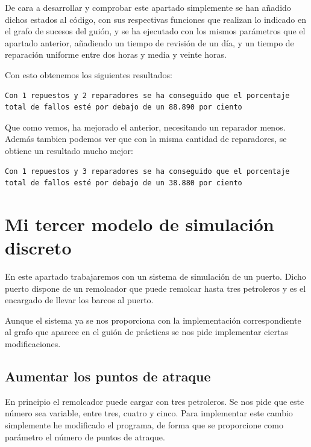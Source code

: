 \documentclass[12pt, spanish]{article}
\begin{document}
De cara a desarrollar y comprobar este apartado simplemente se han añadido dichos estados al código, con sus respectivas funciones que realizan lo indicado en el grafo de sucesos del guión, y se ha ejecutado con los mismos parámetros que el apartado anterior, añadiendo un tiempo de revisión de un día, y un tiempo de reparación uniforme entre dos horas y media y veinte horas.

Con esto obtenemos los siguientes resultados:

\begin{lstlisting}
Con 1 repuestos y 2 reparadores se ha conseguido que el porcentaje total de fallos esté por debajo de un 88.890 por ciento
\end{lstlisting}

Que como vemos, ha mejorado el anterior, necesitando un reparador menos. Además tambien podemos ver que con la misma cantidad de reparadores, se obtiene un resultado mucho mejor:

\begin{lstlisting}
Con 1 repuestos y 3 reparadores se ha conseguido que el porcentaje total de fallos esté por debajo de un 38.880 por ciento
\end{lstlisting}

\newpage

\section{Mi tercer modelo de simulación discreto}

En este apartado trabajaremos con un sistema de simulación de un puerto. Dicho puerto dispone de un remolcador que puede remolcar hasta tres petroleros y es el encargado de llevar los barcos al puerto.

Aunque el sistema ya se nos proporciona con la implementación correspondiente al grafo que aparece en el guión de prácticas se nos pide implementar ciertas modificaciones.

\subsection{Aumentar los puntos de atraque}

En principio el remolcador puede cargar con tres petroleros. Se nos pide que este número sea variable, entre tres, cuatro y cinco. Para implementar este cambio simplemente he modificado el programa, de forma que se proporcione como parámetro el número de puntos de atraque.
\end{document}
